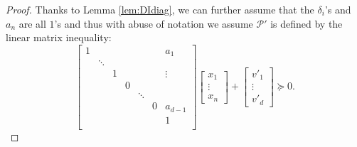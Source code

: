 \documentclass{elsarticle}
\theoremstyle{plain}
\theoremstyle{definition}
\newcommand{\PP}{\mathcal{P}}
\def\diag{\mathrm{diag}}
\begin{document}
\begin{proof}
Thanks to Lemma \ref{lem:DIdiag},
we can further assume that the $\delta_i$'s and $a_n$ are all $1$'s
and thus with abuse of notation we assume $\PP'$ is defined by
the linear matrix inequality:
\[
\left[
\begin{smallmatrix}
1 &        &   &   &        &   & a_1     \\[-.25cm]
  & \ddots &   &   &        &   &         \\[-.35cm]
  &	   & 1 &   &        &   &  \vdots  \\
&	   &   & 0 &        &   &    \\[-.25cm]
  &	   &   &   & \ddots &   &         \\
  &	   &   &   &	    & 0 & a_{d-1} \\ 
  &	   &   &   &	    &	& 1 	  \\
\end{smallmatrix}
\right]
\begin{bmatrix}
  x_1 \\
  \vdots \\
  x_n
\end{bmatrix}
+
\begin{bmatrix}
  v'_1 \\
  \vdots \\
  v'_d
\end{bmatrix}
\succeq 0.
\]


\end{proof}
\end{document}
